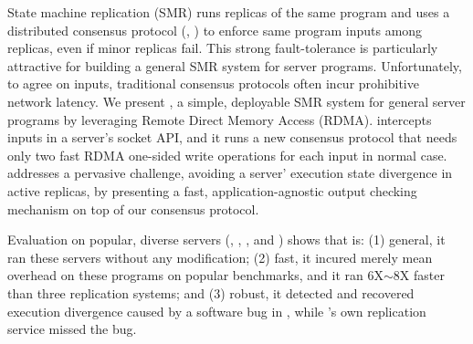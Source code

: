 

State machine replication (SMR) runs replicas of the same program and 
uses a distributed consensus protocol (\eg, \paxos) to enforce same program 
inputs among replicas, even if minor replicas fail. This strong 
fault-tolerance is particularly attractive for building a general SMR system 
for server programs. Unfortunately, to agree on inputs, traditional consensus 
protocols often incur prohibitive network latency. We present \xxx, a simple, 
deployable SMR system for general server programs by leveraging Remote Direct 
Memory Access (RDMA). \xxx intercepts inputs in a server's socket API, and it 
runs a new \paxos consensus protocol that needs only two fast RDMA one-sided 
write operations for each input in normal case. \xxx addresses a pervasive 
challenge, avoiding a server' execution state divergence in active replicas, by 
presenting a fast, application-agnostic output checking mechanism on top of our 
consensus protocol.

Evaluation on \nprog popular, diverse servers (\eg, \memcached, \mysql, 
and \clamav) shows that \xxx is: (1) general, it ran these servers without any 
modification; (2) fast, it incured merely \overhead mean overhead 
on these programs on popular benchmarks, and it ran 6X$\sim$8X faster than 
three replication systems; and (3) robust, it detected and recovered execution 
divergence caused by a software bug in \redis, while \redis's own replication 
service missed the bug.


